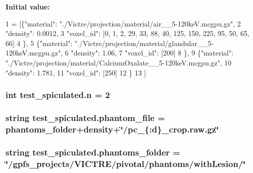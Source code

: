 {\bfseries Initial value\-:}
\begin{DoxyCode}
1 = [\{\textcolor{stringliteral}{"material"}: \textcolor{stringliteral}{"./Victre/projection/material/air\_\_5-120keV.mcgpu.gz"},
2                           \textcolor{stringliteral}{"density"}: 0.0012,
3                           \textcolor{stringliteral}{"voxel\_id"}: [0, 1, 2, 29, 33, 88, 40, 125, 150, 225, 95, 50, 65, 66]
4                           \},
5                          \{\textcolor{stringliteral}{"material"}: \textcolor{stringliteral}{"./Victre/projection/material/glandular\_\_5-120keV.mcgpu.gz"},
6                           \textcolor{stringliteral}{"density"}: 1.06,
7                              \textcolor{stringliteral}{"voxel\_id"}: [200]
8                           \},
9                          \{\textcolor{stringliteral}{"material"}: \textcolor{stringliteral}{"./Victre/projection/material/CalciumOxalate\_\_5-120keV.mcgpu.gz"},
10                           \textcolor{stringliteral}{"density"}: 1.781,
11                              \textcolor{stringliteral}{"voxel\_id"}: [250]
12                           \}
13                          ]
\end{DoxyCode}
\hypertarget{namespacetest__spiculated_a6d4fc5a3e76208ad33c81d7bffb36de5}{
\subsubsection[{n}]{\setlength{\rightskip}{0pt plus 5cm}int test\-\_\-spiculated.\-n = 2}}\label{namespacetest__spiculated_a6d4fc5a3e76208ad33c81d7bffb36de5}
\hypertarget{namespacetest__spiculated_a38dbe89cf6d710045fcb1f252ce6db10}{
\subsubsection[{phantom\-\_\-file}]{\setlength{\rightskip}{0pt plus 5cm}string test\-\_\-spiculated.\-phantom\-\_\-file = {\bf phantoms\-\_\-folder}+{\bf density}+\char`\"{}/pc\-\_\-\{\-:d\}\-\_\-crop.\-raw.\-gz\char`\"{}}}\label{namespacetest__spiculated_a38dbe89cf6d710045fcb1f252ce6db10}
\hypertarget{namespacetest__spiculated_a8e2ee47dc71ed73ef801fe300660add5}{
\subsubsection[{phantoms\-\_\-folder}]{\setlength{\rightskip}{0pt plus 5cm}string test\-\_\-spiculated.\-phantoms\-\_\-folder = \char`\"{}/gpfs\-\_\-projects/V\-I\-C\-T\-R\-E/pivotal/phantoms/with\-Lesion/\char`\"{}}}\label{namespacetest__spiculated_a8e2ee47dc71ed73ef801fe300660add5}

